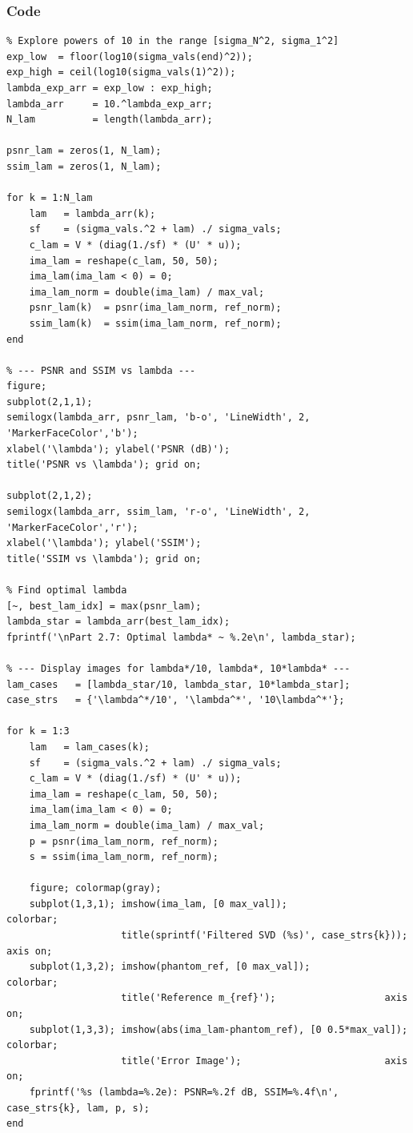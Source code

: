 \documentclass[12pt,a4paper]{article}
\begin{document}
\subsubsection*{Code}
\begin{lstlisting}
% Explore powers of 10 in the range [sigma_N^2, sigma_1^2]
exp_low  = floor(log10(sigma_vals(end)^2));
exp_high = ceil(log10(sigma_vals(1)^2));
lambda_exp_arr = exp_low : exp_high;
lambda_arr     = 10.^lambda_exp_arr;
N_lam          = length(lambda_arr);

psnr_lam = zeros(1, N_lam);
ssim_lam = zeros(1, N_lam);

for k = 1:N_lam
    lam   = lambda_arr(k);
    sf    = (sigma_vals.^2 + lam) ./ sigma_vals;
    c_lam = V * (diag(1./sf) * (U' * u));
    ima_lam = reshape(c_lam, 50, 50);
    ima_lam(ima_lam < 0) = 0;
    ima_lam_norm = double(ima_lam) / max_val;
    psnr_lam(k)  = psnr(ima_lam_norm, ref_norm);
    ssim_lam(k)  = ssim(ima_lam_norm, ref_norm);
end

% --- PSNR and SSIM vs lambda ---
figure;
subplot(2,1,1);
semilogx(lambda_arr, psnr_lam, 'b-o', 'LineWidth', 2, 'MarkerFaceColor','b');
xlabel('\lambda'); ylabel('PSNR (dB)');
title('PSNR vs \lambda'); grid on;

subplot(2,1,2);
semilogx(lambda_arr, ssim_lam, 'r-o', 'LineWidth', 2, 'MarkerFaceColor','r');
xlabel('\lambda'); ylabel('SSIM');
title('SSIM vs \lambda'); grid on;

% Find optimal lambda
[~, best_lam_idx] = max(psnr_lam);
lambda_star = lambda_arr(best_lam_idx);
fprintf('\nPart 2.7: Optimal lambda* ~ %.2e\n', lambda_star);

% --- Display images for lambda*/10, lambda*, 10*lambda* ---
lam_cases   = [lambda_star/10, lambda_star, 10*lambda_star];
case_strs   = {'\lambda^*/10', '\lambda^*', '10\lambda^*'};

for k = 1:3
    lam   = lam_cases(k);
    sf    = (sigma_vals.^2 + lam) ./ sigma_vals;
    c_lam = V * (diag(1./sf) * (U' * u));
    ima_lam = reshape(c_lam, 50, 50);
    ima_lam(ima_lam < 0) = 0;
    ima_lam_norm = double(ima_lam) / max_val;
    p = psnr(ima_lam_norm, ref_norm);
    s = ssim(ima_lam_norm, ref_norm);

    figure; colormap(gray);
    subplot(1,3,1); imshow(ima_lam, [0 max_val]);               colorbar;
                    title(sprintf('Filtered SVD (%s)', case_strs{k})); axis on;
    subplot(1,3,2); imshow(phantom_ref, [0 max_val]);            colorbar;
                    title('Reference m_{ref}');                   axis on;
    subplot(1,3,3); imshow(abs(ima_lam-phantom_ref), [0 0.5*max_val]); colorbar;
                    title('Error Image');                         axis on;
    fprintf('%s (lambda=%.2e): PSNR=%.2f dB, SSIM=%.4f\n', case_strs{k}, lam, p, s);
end
\end{lstlisting}
\end{document}
